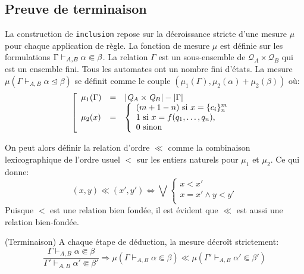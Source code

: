 \subsection{Preuve de terminaison}
\label{sec:termination}

La construction de \lstinline!inclusion! repose sur la décroissance stricte
d'une mesure $\mu$ pour chaque application de règle.
La fonction de mesure $\mu$ est définie sur les formulations $\Gamma \vdash_{\mathit A,\mathit B} \alpha \Subset \beta$.
La relation $\Gamma$ est un sous-ensemble de $\mathcal{Q}_A \times \mathcal{Q}_B$ qui est un ensemble fini. Tous les automates ont un nombre fini
d'états. La mesure $\mu({\Gamma \vdash_{A, B} \alpha \unlhd \beta})$ se définit comme le couple $(\mu_1(\Gamma), \mu_2(\alpha)+\mu_2(\beta))$ où:
{\small
\[\left[
  \begin{array}{lcl}
    \mu_1(\Gamma) & = & | \mathit Q_A \times \mathit Q_B | - |\Gamma|\\
    \mu_2(x) &=&
    \left\{\begin{array}{l}
        (m+1-n) \textrm{ si } x = \{c_i\}^m_n\\
        1 \textrm{ si } x = f(q_1, \dots, q_n),\\
        0 \textrm{ sinon}
      \end{array}\right.\\
  \end{array}\right.
\]}

On peut alors définir la relation d'ordre $\ll$ comme la combinaison lexicographique de l'ordre usuel 
$<$ sur les entiers naturels pour $\mu_1$ et $\mu_2$. Ce qui donne:%
\[(x, y) \ll (x', y') \Longleftrightarrow
\bigvee\left\{
\begin{array}{l}
  x < x' \\
  x = x' \land y < y'\\
\end{array}\right.
\]
Puisque $<$ est une relation bien fondée, il est évident que $\ll$ est aussi une relation bien-fondée.

\begin{theorem}{(Terminaison)}
  A chaque étape de déduction, la mesure décroît strictement:
  \[
  \dfrac{
    \Gamma \vdash_{A, B} \alpha \Subset \beta
  }{
    \Gamma' \vdash_{A, B} \alpha' \Subset \beta'
  }
  \Longrightarrow \mu({\Gamma \vdash_{A, B} \alpha \Subset \beta}) \ll \mu({\Gamma' \vdash_{A, B} \alpha' \Subset \beta'})
  \]
\end{theorem}

